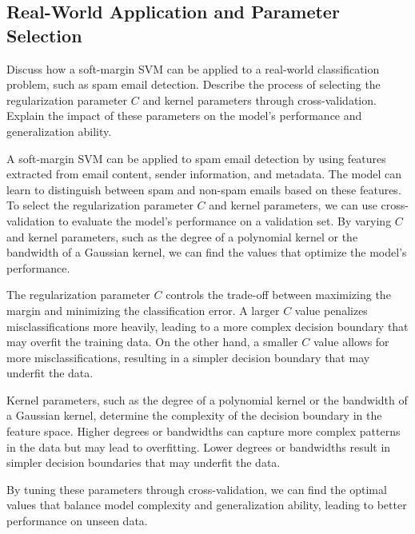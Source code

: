 \subsection{Real-World Application and Parameter Selection}
Discuss how a soft-margin SVM can be applied to a real-world classification problem, such as spam email detection. Describe the process of selecting the regularization parameter $C$ and kernel parameters through cross-validation. Explain the impact of these parameters on the model's performance and generalization ability.
\begin{qsolve}
    \begin{qsolve}[]
        A soft-margin SVM can be applied to spam email detection by using features extracted from email content, sender information, and metadata.
        \splitqsolve[\splitqsolve]
        The model can learn to distinguish between spam and non-spam emails based on these features.
        To select the regularization parameter $C$ and kernel parameters,
        we can use cross-validation to evaluate the model's performance on a validation set.
        By varying $C$ and kernel parameters, such as the degree of a polynomial kernel or the bandwidth of a Gaussian kernel, we can find the values that optimize the model's performance. 

        The regularization parameter $C$ controls the trade-off between maximizing the margin and minimizing the classification error. A larger $C$ value penalizes misclassifications more heavily, leading to a more complex decision boundary that may overfit the training data. On the other hand, a smaller $C$ value allows for more misclassifications, resulting in a simpler decision boundary that may underfit the data. 

        Kernel parameters, such as the degree of a polynomial kernel or the bandwidth of a Gaussian kernel, determine the complexity of the decision boundary in the feature space. Higher degrees or bandwidths can capture more complex patterns in the data but may lead to overfitting. Lower degrees or bandwidths result in simpler decision boundaries that may underfit the data. 

        By tuning these parameters through cross-validation, we can find the optimal values that balance model complexity and generalization ability, leading to better performance on unseen data.
    \end{qsolve}
\end{qsolve}
